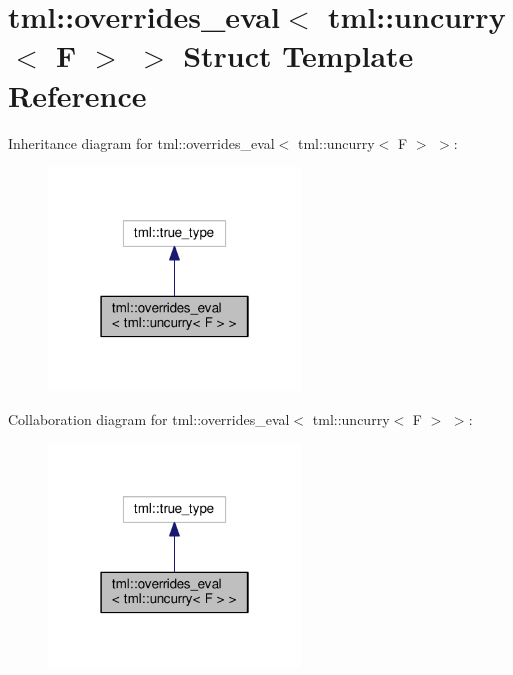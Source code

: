 \hypertarget{structtml_1_1overrides__eval_3_01tml_1_1uncurry_3_01_f_01_4_01_4}{\section{tml\+:\+:overrides\+\_\+eval$<$ tml\+:\+:uncurry$<$ F $>$ $>$ Struct Template Reference}
\label{structtml_1_1overrides__eval_3_01tml_1_1uncurry_3_01_f_01_4_01_4}
}


Inheritance diagram for tml\+:\+:overrides\+\_\+eval$<$ tml\+:\+:uncurry$<$ F $>$ $>$\+:
\nopagebreak
\begin{figure}[H]
\begin{center}
\leavevmode
\includegraphics[width=190pt]{structtml_1_1overrides__eval_3_01tml_1_1uncurry_3_01_f_01_4_01_4__inherit__graph}
\end{center}
\end{figure}


Collaboration diagram for tml\+:\+:overrides\+\_\+eval$<$ tml\+:\+:uncurry$<$ F $>$ $>$\+:
\nopagebreak
\begin{figure}[H]
\begin{center}
\leavevmode
\includegraphics[width=190pt]{structtml_1_1overrides__eval_3_01tml_1_1uncurry_3_01_f_01_4_01_4__coll__graph}
\end{center}
\end{figure}


